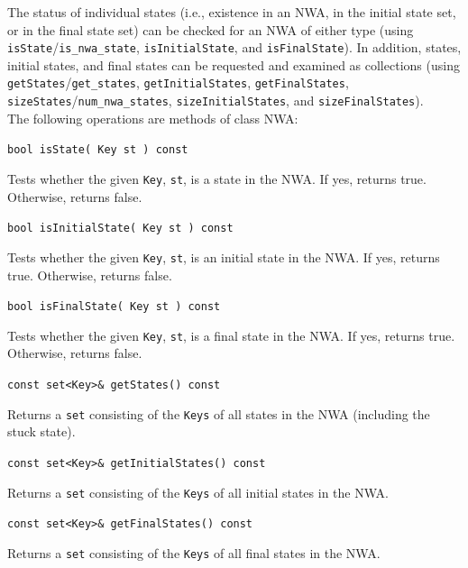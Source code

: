 \documentclass{llncs}
\begin{document}
The status of individual states (i.e., existence in an NWA, in the initial state set, or in the final state set) can be checked for an NWA of either type (using \texttt{isState}/\texttt{is\_nwa\_state}, \texttt{isInitialState}, and \texttt{isFinalState}).  In addition, states, initial states, and final states can be requested and examined as collections (using \texttt{getStates}/\texttt{get\_states}, \texttt{getInitialStates}, \texttt{getFinalStates}, \texttt{sizeStates}/\texttt{num\_nwa\_states}, \texttt{sizeInitialStates}, and \texttt{sizeFinalStates}). \\

\noindent The following operations are methods of class NWA:

\begin{description}

  \item\texttt{bool isState( Key st ) const} \nopagebreak

    Tests whether the given \texttt{Key}, \texttt{st}, is a state in the NWA.  If yes, returns true.  Otherwise, returns false.

  \item\texttt{bool isInitialState( Key st ) const} \nopagebreak

    Tests whether the given \texttt{Key}, \texttt{st}, is an initial state in the NWA.  If yes, returns true.  Otherwise, returns false.

  \item\texttt{bool isFinalState( Key st ) const} \nopagebreak

    Tests whether the given \texttt{Key}, \texttt{st}, is a final state in the NWA.  If yes, returns true.  Otherwise, returns false.

  \item\texttt{const set<Key>\& getStates() const} \nopagebreak

    Returns a \texttt{set} consisting of the \texttt{Keys} of all states in the NWA (including the stuck state).

  \item\texttt{const set<Key>\& getInitialStates() const} \nopagebreak

    Returns a \texttt{set} consisting of the \texttt{Keys} of all initial states in the NWA.

  \item\texttt{const set<Key>\& getFinalStates() const} \nopagebreak

    Returns a \texttt{set} consisting of the \texttt{Keys} of all final states in the NWA.


\end{description}
\end{document}
